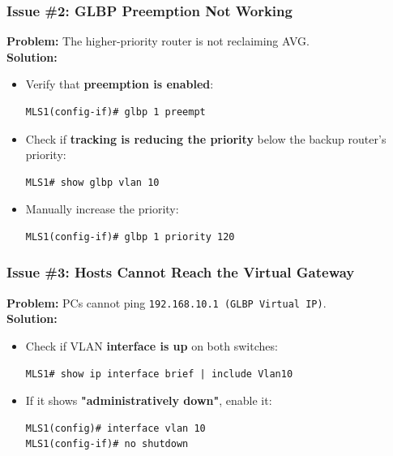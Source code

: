 \documentclass[a4paper]{book}
\begin{document}
\subsubsection{Issue \#2: GLBP Preemption Not Working}
\textbf{Problem:} The higher-priority router is not reclaiming AVG.\\
\textbf{Solution:}
\begin{itemize}
\item Verify that \textbf{preemption is enabled}:
\begin{lstlisting}
MLS1(config-if)# glbp 1 preempt
\end{lstlisting}

\item Check if \textbf{tracking is reducing the priority} below the backup router’s priority:
\begin{lstlisting}
MLS1# show glbp vlan 10
\end{lstlisting}

\item Manually increase the priority:
\begin{lstlisting}
MLS1(config-if)# glbp 1 priority 120
\end{lstlisting}
\end{itemize}

\subsubsection{Issue \#3: Hosts Cannot Reach the Virtual Gateway}
\textbf{Problem:} PCs cannot ping \texttt{192.168.10.1 (GLBP Virtual IP)}.\\
\textbf{Solution:}
\begin{itemize}
\item Check if VLAN \textbf{interface is up} on both switches:
\begin{lstlisting}
MLS1# show ip interface brief | include Vlan10
\end{lstlisting}
\item If it shows \textbf{"administratively down"}, enable it:
\begin{lstlisting}
MLS1(config)# interface vlan 10
MLS1(config-if)# no shutdown
\end{lstlisting}
\end{itemize}
\end{document}
